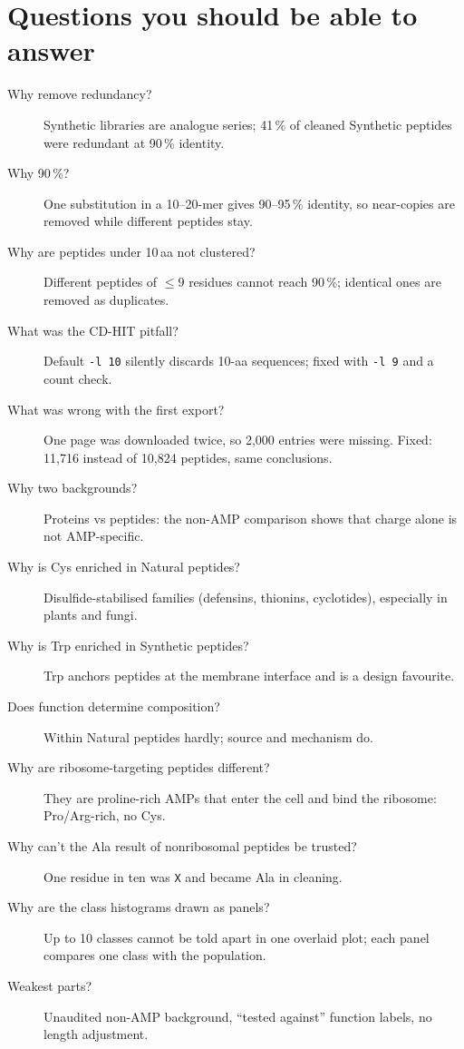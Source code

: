 \documentclass[11pt,a4paper]{article}
\newcommand{\amin}{\,aa}
\begin{document}
\section{Questions you should be able to answer}
\begin{description}
\item[Why remove redundancy?] Synthetic libraries are analogue series; 41\,\% of cleaned Synthetic peptides were redundant at 90\,\% identity.
\item[Why 90\,\%?] One substitution in a 10--20-mer gives 90--95\,\% identity, so near-copies are removed while different peptides stay.
\item[Why are peptides under 10\amin{} not clustered?] Different peptides of $\leq9$ residues cannot reach 90\,\%; identical ones are removed as duplicates.
\item[What was the CD-HIT pitfall?] Default \texttt{-l 10} silently discards 10-aa sequences; fixed with \texttt{-l 9} and a count check.
\item[What was wrong with the first export?] One page was downloaded twice, so 2{,}000 entries were missing. Fixed: 11{,}716 instead of 10{,}824 peptides, same conclusions.
\item[Why two backgrounds?] Proteins vs peptides: the non-AMP comparison shows that charge alone is not AMP-specific.
\item[Why is Cys enriched in Natural peptides?] Disulfide-stabilised families (defensins, thionins, cyclotides), especially in plants and fungi.
\item[Why is Trp enriched in Synthetic peptides?] Trp anchors peptides at the membrane interface and is a design favourite.
\item[Does function determine composition?] Within Natural peptides hardly; source and mechanism do.
\item[Why are ribosome-targeting peptides different?] They are proline-rich AMPs that enter the cell and bind the ribosome: Pro/Arg-rich, no Cys.
\item[Why can't the Ala result of nonribosomal peptides be trusted?] One residue in ten was \texttt{X} and became Ala in cleaning.
\item[Why are the class histograms drawn as panels?] Up to 10 classes cannot be told apart in one overlaid plot; each panel compares one class with the population.
\item[Weakest parts?] Unaudited non-AMP background, ``tested against'' function labels, no length adjustment.
\end{description}
\end{document}
